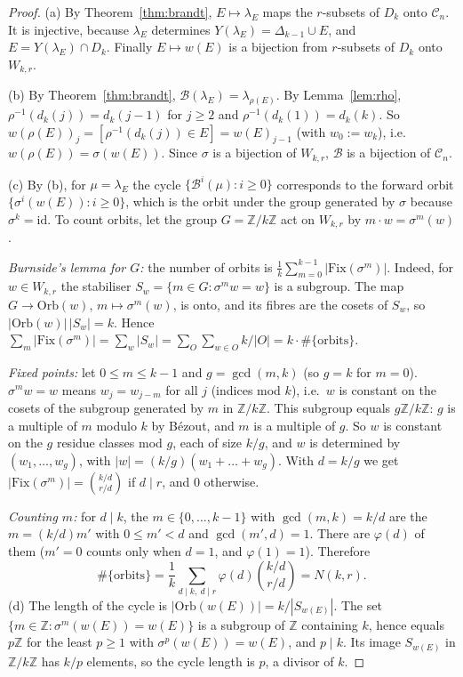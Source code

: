 \documentclass[11pt]{article}
\theoremstyle{definition}
\newcommand{\Z}{\mathbb{Z}}
\newcommand{\B}{\mathcal{B}}
\renewcommand{\le}{\leqslant}
\renewcommand{\ge}{\geqslant}
\begin{document}
\begin{proof}
(a) By Theorem~\ref{thm:brandt}, $E\mapsto\lambda_E$ maps the $r$-subsets of $D_k$ onto $\mathcal C_n$.  It is injective,
because $\lambda_E$ determines $Y(\lambda_E)=\Delta_{k-1}\cup E$, and $E=Y(\lambda_E)\cap D_k$.  Finally $E\mapsto w(E)$ is a
bijection from $r$-subsets of $D_k$ onto $W_{k,r}$.

(b) By Theorem~\ref{thm:brandt}, $\B(\lambda_E)=\lambda_{\rho(E)}$.  By Lemma~\ref{lem:rho}, $\rho^{-1}(d_k(j))=d_k(j-1)$ for
$j\ge2$ and $\rho^{-1}(d_k(1))=d_k(k)$.  So $w(\rho(E))_j=[\rho^{-1}(d_k(j))\in E]=w(E)_{j-1}$ (with $w_0:=w_k$), i.e.\
$w(\rho(E))=\sigma(w(E))$.  Since $\sigma$ is a bijection of $W_{k,r}$, $\B$ is a bijection of $\mathcal C_n$.

(c) By (b), for $\mu=\lambda_E$ the cycle $\{\B^i(\mu):i\ge0\}$ corresponds to the forward orbit
$\{\sigma^i(w(E)):i\ge0\}$, which is the orbit under the group generated by $\sigma$ because $\sigma^k=\mathrm{id}$.  To count
orbits, let the group $G=\Z/k\Z$ act on $W_{k,r}$ by $m\cdot w=\sigma^m(w)$.

\emph{Burnside's lemma for $G$:} the number of orbits is $\frac1k\sum_{m=0}^{k-1}|\mathrm{Fix}(\sigma^m)|$.
Indeed, for $w\in W_{k,r}$ the stabiliser $S_w=\{m\in G:\sigma^m w=w\}$ is a subgroup.  The map
$G\to\mathrm{Orb}(w)$, $m\mapsto\sigma^m(w)$, is onto, and its fibres are the cosets of $S_w$, so
$|\mathrm{Orb}(w)|\,|S_w|=k$.  Hence $\sum_m|\mathrm{Fix}(\sigma^m)|=\sum_w|S_w|
=\sum_{O}\sum_{w\in O}k/|O|=k\cdot\#\{\text{orbits}\}$.

\emph{Fixed points:} let $0\le m\le k-1$ and $g=\gcd(m,k)$ (so $g=k$ for $m=0$).  $\sigma^m w=w$ means
$w_j=w_{j-m}$ for all $j$ (indices mod $k$), i.e.\ $w$ is constant on the cosets of the subgroup generated by
$m$ in $\Z/k\Z$.  This subgroup equals $g\Z/k\Z$: $g$ is a multiple of $m$ modulo $k$ by B\'ezout, and $m$ is a
multiple of $g$.  So $w$ is constant on the $g$ residue classes mod $g$, each of size $k/g$, and $w$ is
determined by $(w_1,\dots,w_g)$, with $|w|=(k/g)(w_1+\dots+w_g)$.  With $d=k/g$ we get
$|\mathrm{Fix}(\sigma^m)|=\binom{k/d}{r/d}$ if $d\mid r$, and $0$ otherwise.

\emph{Counting $m$:} for $d\mid k$, the $m\in\{0,\dots,k-1\}$ with $\gcd(m,k)=k/d$ are the $m=(k/d)m'$ with
$0\le m'<d$ and $\gcd(m',d)=1$.  There are $\varphi(d)$ of them ($m'=0$ counts only when $d=1$, and
$\varphi(1)=1$).  Therefore
\[\#\{\text{orbits}\}=\frac1k\sum_{d\mid k,\ d\mid r}\varphi(d)\binom{k/d}{r/d}=N(k,r).\]
(d) The length of the cycle is $|\mathrm{Orb}(w(E))|=k/|S_{w(E)}|$.  The set $\{m\in\Z:\sigma^m(w(E))=w(E)\}$ is a subgroup of $\Z$ containing $k$, hence equals $p\Z$ for the
least $p\ge1$ with $\sigma^p(w(E))=w(E)$, and $p\mid k$.  Its image $S_{w(E)}$ in $\Z/k\Z$ has $k/p$ elements, so
the cycle length is $p$, a divisor of $k$.
\end{proof}
\end{document}
